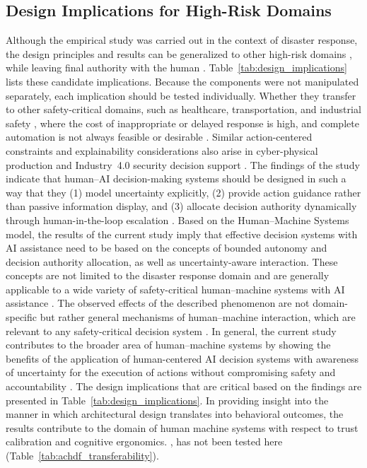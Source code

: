 \documentclass[journal]{IEEEtran}
\theoremstyle{plain}
\theoremstyle{definition}
\providecommand{\DIFaddtex}[1]{{\protect\color{blue} \sf #1}} %
\providecommand{\DIFdeltex}[1]{{\protect\color{red} \scriptsize #1}} %
\providecommand{\DIFaddbegin}{} %
\providecommand{\DIFaddend}{} %
\providecommand{\DIFdelbegin}{} %
\providecommand{\DIFdelend}{} %
\providecommand{\DIFadd}[1]{\texorpdfstring{\DIFaddtex{#1}}{#1}} %
\providecommand{\DIFdel}[1]{\texorpdfstring{\DIFdeltex{#1}}{}} %
\newcommand{\DIFscaledelfig}{0.5}
\newlength{\DIFdelgraphicswidth} %
\newlength{\DIFdelgraphicsheight} %
\newcommand{\DIFaddincludegraphics}[2][]{{\color{blue}\fbox{\DIFOincludegraphics[#1]{#2}}}} %
\newcommand{\DIFdelincludegraphics}[2][]{%
\sbox{\DIFdelgraphicsbox}{\DIFOincludegraphics[#1]{#2}}%
\settoboxwidth{\DIFdelgraphicswidth}{\DIFdelgraphicsbox} %
\settoboxtotalheight{\DIFdelgraphicsheight}{\DIFdelgraphicsbox} %
\scalebox{\DIFscaledelfig}{%
\parbox[b]{\DIFdelgraphicswidth}{\usebox{\DIFdelgraphicsbox}\\[-\baselineskip] \rule{\DIFdelgraphicswidth}{0em}}\llap{\resizebox{\DIFdelgraphicswidth}{\DIFdelgraphicsheight}{%
\setlength{\unitlength}{\DIFdelgraphicswidth}%
\begin{picture}(1,1)%
\thicklines\linethickness{2pt} %
{\color[rgb]{1,0,0}\put(0,0){\framebox(1,1){}}}%
{\color[rgb]{1,0,0}\put(0,0){\line( 1,1){1}}}%
{\color[rgb]{1,0,0}\put(0,1){\line(1,-1){1}}}%
\end{picture}%
}\hspace*{3pt}}} %
} %
\DeclareRobustCommand{\DIFaddbegin}{\DIFOaddbegin \let\includegraphics\DIFaddincludegraphics} %
\DeclareRobustCommand{\DIFaddend}{\DIFOaddend \let\includegraphics\DIFOincludegraphics} %
\DeclareRobustCommand{\DIFdelbegin}{\DIFOdelbegin \let\includegraphics\DIFdelincludegraphics} %
\DeclareRobustCommand{\DIFdelend}{\DIFOaddend \let\includegraphics\DIFOincludegraphics} %
\begin{document}
\subsection{\DIFdel{Design Implications for High-Risk Domains}}
\addtocounter{subsection}{-1}%
\DIFdel{Although the empirical study was carried out in the context of disaster response, the design principles and results can be generalized to other high-risk domains}\DIFdelend \DIFaddbegin \DIFadd{, while leaving final authority with the human \cite{Assaad2023TAS,Zhang2022THMS,Bach2024Access,Parasuraman2000LOA}. Table~\ref{tab:design_implications} lists these candidate implications. Because the components were not manipulated separately, each implication should be tested individually. Whether they transfer to other safety-critical domains, }\DIFaddend such as healthcare, transportation, and industrial safety \DIFdelbegin \DIFdel{, where the cost of inappropriate or delayed response is high, and complete automation is not always feasible or desirable \cite{PerezCerrolaza2024CSUR,Rao2024IJDRS,Rokhideh2025IJDRS,Birkmann2013NatHazards}. Similar action-centered constraints and explainability considerations also arise in cyber-physical production and Industry~4.0 security decision support \cite{Farhan2025TCE}.
The findings of the study indicate that human--AI decision-making systems should be designed in such a way that they (1) model uncertainty explicitly, (2) provide action guidance rather than passive information display, and (3) allocate decision authority dynamically through human-in-the-loop escalation \cite{Assaad2023TAS,Zhang2022THMS,Bach2024Access}.
Based on the Human--Machine Systems model, the results of the current study imply that effective decision systems with AI assistance need to be based on the concepts of bounded autonomy and decision authority allocation, as well as uncertainty-aware interaction. These concepts are not limited to the disaster response domain and are generally applicable to a wide variety of safety-critical human--machine systems with AI assistance \cite{Yang2022THMSReview,PerezCerrolaza2024CSUR}.
        The observed effects of the described phenomenon are not domain-specific but rather general mechanisms of human--machine interaction, which are relevant to any safety-critical decision system \cite{Bach2024Access,Hodgson2013THMS}. In general, the current study contributes to the broader area of human--machine systems by showing the benefits of the application of human-centered AI decision systems with awareness of uncertainty for the execution of actions without compromising safety and accountability \cite{Lai2023FAccT,Yang2022THMSReview}.
        The design implications that are critical based on the findings are presented in Table~\ref{tab:design_implications}. In providing insight into the manner in which architectural design translates into behavioral outcomes, the results contribute to the domain of human machine systems with respect to trust calibration and cognitive ergonomics. }\DIFdelend \DIFaddbegin \DIFadd{\cite{PerezCerrolaza2024CSUR,Farhan2025TCE}, has not been tested here (Table~\ref{tab:achdf_transferability}).
}\DIFaddend 
\end{document}
